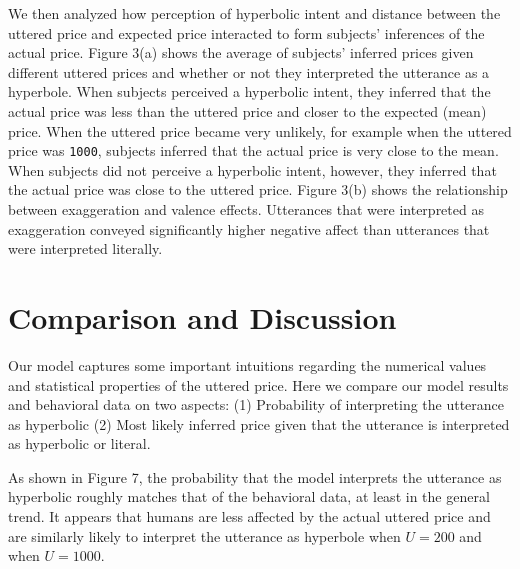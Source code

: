\documentclass{article} %
\begin{document}
We then analyzed how perception of hyperbolic intent and distance between the uttered price and expected price interacted to form subjects' inferences of the actual price. Figure 3(a) shows the average of subjects' inferred prices given different uttered prices and whether or not they interpreted the utterance as a hyperbole. When subjects perceived a hyperbolic intent, they inferred that the actual price was less than the uttered price and closer to the expected (mean) price. When the uttered price became very unlikely, for example when the uttered price was \texttt{1000}, subjects inferred that the actual price is very close to the mean. When subjects did not perceive a hyperbolic intent, however, they inferred that the actual price was close to the uttered price. Figure 3(b) shows the relationship between exaggeration and valence effects. Utterances that were interpreted as exaggeration conveyed significantly higher negative affect than utterances that were interpreted literally. 


\section{Comparison and Discussion}
Our model captures some important intuitions regarding the numerical values and statistical properties of the uttered price. Here we compare our model results and behavioral data on two aspects: (1) Probability of interpreting the utterance as hyperbolic (2) Most likely inferred price given that the utterance is interpreted as hyperbolic or literal.


As shown in Figure 7, the probability that the model interprets the utterance as hyperbolic roughly matches that of the behavioral data, at least in the general trend. It appears that humans are less affected by the actual uttered price and are similarly likely to interpret the utterance as hyperbole when $U = 200$ and when $U = 1000$.
\end{document}
